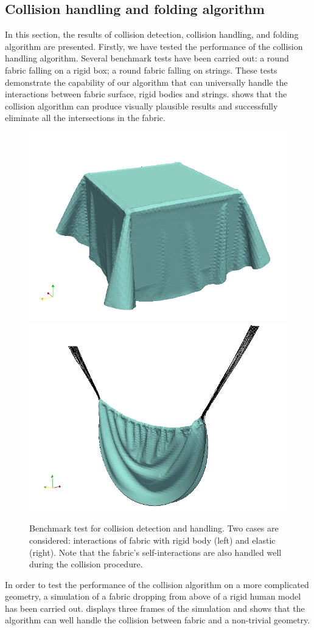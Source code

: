\subsection{Collision handling and folding algorithm}
In this section, the results of collision detection, collision handling, and 
folding algorithm are presented. Firstly, we have tested the performance of 
the collision handling algorithm. Several benchmark tests have been carried 
out: a round fabric falling on a rigid box; a round fabric falling on strings. 
These tests demonstrate the capability 
of our algorithm that can universally handle the interactions between fabric 
surface, rigid bodies and strings.  shows that the 
collision algorithm can produce visually plausible results and successfully 
eliminate all the intersections in the fabric. 
\begin{figure}[!htbp]
\includegraphics[width=0.45\columnwidth]{Figures/fabric-box.jpg}
\includegraphics[width=0.45\columnwidth]{Figures/fabric-string.jpg}
\caption{Benchmark test for collision detection and handling. Two cases are 
considered: interactions of fabric with rigid body (left) and elastic (right).
Note that the fabric's self-interactions are also handled well during the 
collision procedure.}
\label{fig:collision_test}
\end{figure}
In order to test the performance of 
the collision algorithm on a more complicated geometry, a simulation of a fabric
dropping from above of a rigid human model has been carried out. 
 displays three frames of the simulation and shows 
that the algorithm can well handle the collision between fabric and a non-trivial geometry.
